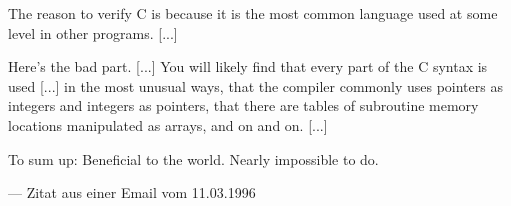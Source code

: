 \thispagestyle{empty}

\begin{itshape}
\noindent
The reason to verify C is because it is the most common language used at some level in other programs. [...]

\noindent
Here's the bad part. [...] You will likely find that every part of the C syntax is used [...] in the most unusual ways, that the compiler commonly uses pointers as integers and integers as pointers, that there are tables of subroutine memory locations manipulated as arrays, and on and on. [...]

\noindent
To sum up: Beneficial to the world. Nearly impossible to do. \\
\end{itshape}

\hfill --- Zitat aus einer Email vom 11.03.1996